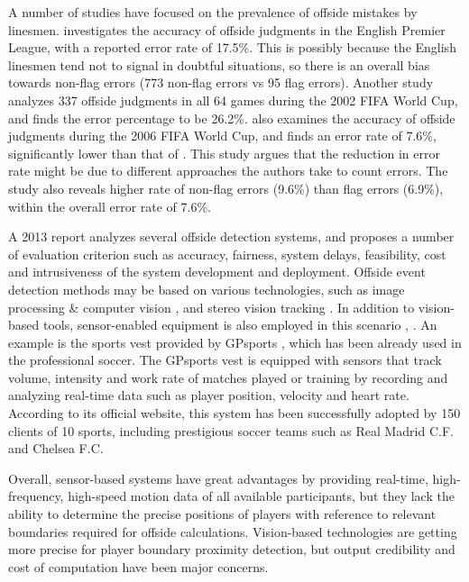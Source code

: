 A number of studies have focused on the prevalence of offside mistakes by linesmen. 
\cite{catteeuw2010offside} investigates the accuracy of offside judgments in the English Premier League, with a reported error rate of 17.5\%. This is possibly because the English linesmen tend not to signal in doubtful situations, so there is an overall bias towards non-flag errors (773 non-flag errors vs 95 flag errors).
Another study \cite{helsen2006errors} analyzes 337 offside judgments in all 64 games during the 2002 FIFA World Cup, and finds the error percentage to be 26.2\%.
\cite{catteeuw2010offside} also examines the accuracy of offside judgments during the 2006 FIFA World Cup, and finds an error rate of 7.6\%, significantly lower than that of \cite{helsen2006errors}.
This study argues that the reduction in error rate might be due to different approaches the authors take to count errors.
The study also reveals higher rate of non-flag errors (9.6\%) than flag errors (6.9\%), within the overall error rate of 7.6\%.

A 2013 report \cite{fowler2010feasible} analyzes several offside detection systems, and proposes a number of evaluation criterion such as accuracy, fairness, system delays, feasibility, cost and intrusiveness of the system development and deployment.
Offside event detection methods may be based on various technologies, such as image processing \& computer vision \cite{naidoo2006soccer}, and stereo vision tracking  \cite{borg2007detecting}.
In addition to vision-based tools, sensor-enabled equipment is also employed in this scenario \cite{regan2013sports}, \cite{garcia2011wireless}.
An example is the sports vest provided by GPsports \cite{gpsports}, which has been already used in the professional soccer.
The GPsports vest is equipped with sensors that track volume, intensity and work rate of matches played or training by recording and analyzing real-time data such as player position, velocity and heart rate.
According to its official website, this system has been successfully adopted by 150 clients of 10 sports, including prestigious soccer teams such as Real Madrid C.F. and Chelsea F.C.

Overall, sensor-based systems have great advantages by providing real-time, high-frequency, high-speed motion data of all available participants, but they lack the ability to determine the precise positions of players with reference to relevant boundaries required for offside calculations. 
Vision-based technologies are getting more precise for player boundary proximity detection, but output credibility and cost of computation have been major concerns.


